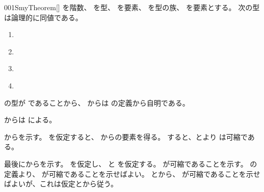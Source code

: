 \documentclass[index]{subfiles}
\begin{document}
\begin{myBlock}{001S}{myTheorem}[]
  を階数、
  を型、
  を要素、
  を型の族、
  を要素とする。
  次の型は論理的に同値である。
  \begin{enumerate}
  \item \label{001S:0000} 
  \item \label{001S:0001} 
  \item \label{001S:0002} 
  \item \label{001S:0003} 
  \end{enumerate}
\end{myBlock}
\begin{myProof}
  の型が
  であることから、
  からは
  \myInlineMath{\myEquiv}の定義から自明である。

  からは
  による。

  からを示す。
  を仮定すると、
  からの要素を得る。
  すると、とより
  は可縮である。

  最後にからを示す。
  を仮定し、
  と
  を仮定する。
  が可縮であることを示す。
  \myInlineMath{\myFiber{\myBlank}{\myBlank}}の定義より、
  が可縮であることを示せばよい。
  とから、
  が可縮であることを示せばよいが、これは仮定とから従う。
\end{myProof}
\end{document}
